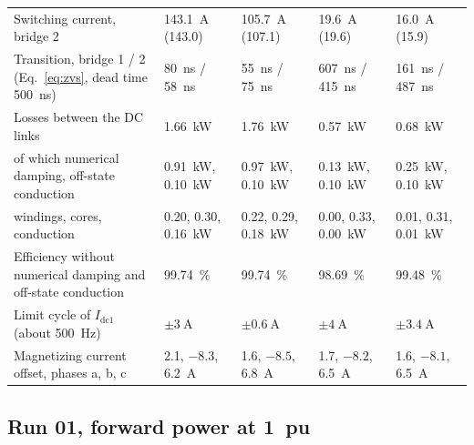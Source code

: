 \documentclass[12pt,a4paper]{scrartcl}
\newcommand{\ped}[1]{_{\mathrm{#1}}}
\begin{document}
\begin{onehalfspace}
\begin{table}[H]
\begin{tabularx}{\textwidth}{@{} >{\raggedright\arraybackslash}p{} X X X X @{}}
		Switching current, bridge 2 & \SI{143.1}{\ampere} (143.0) & \SI{105.7}{\ampere} (107.1) & \SI{19.6}{\ampere} (19.6) & \SI{16.0}{\ampere} (15.9) \\
		Transition, bridge 1 / 2 (Eq.~\eqref{eq:zvs}, dead time \SI{500}{\nano\second}) & \SI{80}{\nano\second} / \SI{58}{\nano\second} & \SI{55}{\nano\second} / \SI{75}{\nano\second} & \SI{607}{\nano\second} / \SI{415}{\nano\second} & \SI{161}{\nano\second} / \SI{487}{\nano\second} \\
		Losses between the DC links & \SI{1.66}{\kilo\watt} & \SI{1.76}{\kilo\watt} & \SI{0.57}{\kilo\watt} & \SI{0.68}{\kilo\watt} \\
		of which numerical damping, off-state conduction & \SI{0.91}{\kilo\watt}, \SI{0.10}{\kilo\watt} & \SI{0.97}{\kilo\watt}, \SI{0.10}{\kilo\watt} & \SI{0.13}{\kilo\watt}, \SI{0.10}{\kilo\watt} & \SI{0.25}{\kilo\watt}, \SI{0.10}{\kilo\watt} \\
		windings, cores, conduction & 0.20, 0.30, \SI{0.16}{\kilo\watt} & 0.22, 0.29, \SI{0.18}{\kilo\watt} & 0.00, 0.33, \SI{0.00}{\kilo\watt} & 0.01, 0.31, \SI{0.01}{\kilo\watt} \\
		Efficiency without numerical damping and off-state conduction & \SI{99.74}{\percent} & \SI{99.74}{\percent} & \SI{98.69}{\percent} & \SI{99.48}{\percent} \\
		Limit cycle of $I\ped{dc1}$ (about \SI{500}{\hertz}) & $\pm\SI{3}{\ampere}$ & $\pm\SI{0.6}{\ampere}$ & $\pm\SI{4}{\ampere}$ & $\pm\SI{3.4}{\ampere}$ \\
		Magnetizing current offset, phases a, b, c & 2.1, $-8.3$, \SI{6.2}{\ampere} & 1.6, $-8.5$, \SI{6.8}{\ampere} & 1.7, $-8.2$, \SI{6.5}{\ampere} & 1.6, $-8.1$, \SI{6.5}{\ampere} \\
		\bottomrule
	\end{tabularx}
\end{table}

\subsection{Run 01, forward power at \SI{1}{pu}}
\label{sec:run01}


\end{onehalfspace}
\end{document}
